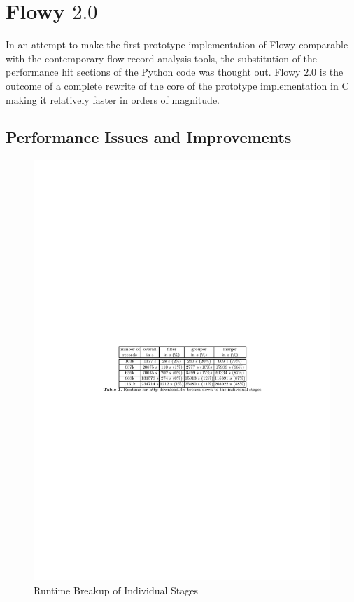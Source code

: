 \chapter{Flowy $2.0$}\label{ch:flowy-2}

In an attempt to make the first prototype implementation of Flowy comparable with the contemporary flow-record analysis tools, the substitution of the performance hit sections of the Python code was thought out. Flowy $2.0$ \cite{jschauer:thesis:2011} is the outcome of a complete rewrite of the core of the prototype implementation in C making it relatively faster in orders of magnitude. 

\section{Performance Issues and Improvements}\label{sec:performance-issues}
\begin{figure}[h!]
\begin{center}
  \includegraphics* [width=1.0\linewidth]{figures/flowy2-profiling}	
  \caption{Runtime Breakup of Individual Stages \cite{jschauer:thesis:2011}}
  \label{fig:flowy2-profiling}
\end{center}
\end{figure}

